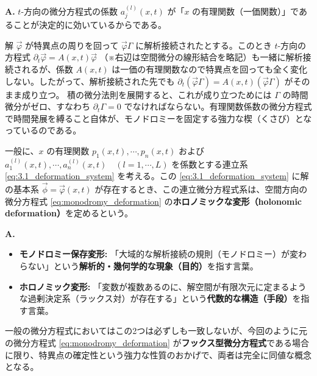 \begin{Q}
\textbf{A.} $t$-方向の微分方程式の係数 $a_j^{(l)}(x,t)$ が「$x$ の有理関数（一価関数）」であることが決定的に効いているからである。

解 $\vec{\varphi}$ が特異点の周りを回って $\vec{\varphi}\Gamma$ に解析接続されたとする。このとき $t$-方向の方程式 $\partial_t \vec{\varphi} = A(x,t)\vec{\varphi}$ （※右辺は空間微分の線形結合を略記）も一緒に解析接続されるが、係数 $A(x,t)$ は一価の有理関数なので特異点を回っても全く変化しない。したがって、解析接続された先でも $\partial_t (\vec{\varphi}\Gamma) = A(x,t)(\vec{\varphi}\Gamma)$ がそのまま成り立つ。
積の微分法則を展開すると、これが成り立つためには $\Gamma$ の時間微分がゼロ、すなわち $\partial_t \Gamma = 0$ でなければならない。有理関数係数の微分方程式で時間発展を縛ること自体が、モノドロミーを固定する強力な楔（くさび）となっているのである。
\end{Q}

\begin{definition}[ホロノミックな変形]
一般に、$x$ の有理関数 $p_{1}(x,t), \cdots, p_{n}(x,t)$ および $a_{1}^{(l)}(x,t), \cdots, a_{n}^{(l)}(x,t) \quad (l=1,\cdots,L)$ を係数とする連立系 \eqref{eq:3.1_deformation_system} を考える。この \eqref{eq:3.1_deformation_system} に解の基本系 $\vec{\phi}=\vec{\varphi}(x,t)$ が存在するとき、この連立微分方程式系は、空間方向の微分方程式 \eqref{eq:monodromy_deformation} の\textbf{ホロノミックな変形（holonomic deformation）}を定めるという。
\end{definition}

\begin{Q}
\textbf{A.} 
\begin{itemize}
    \item \textbf{モノドロミー保存変形:} 「大域的な解析接続の規則（モノドロミー）が変わらない」という\textbf{解析的・幾何学的な現象（目的）}を指す言葉。
    \item \textbf{ホロノミック変形:} 「変数が複数あるのに、解空間が有限次元に定まるような過剰決定系（ラックス対）が存在する」という\textbf{代数的な構造（手段）}を指す言葉。
\end{itemize}
一般の微分方程式においてはこの2つは必ずしも一致しないが、今回のように元の微分方程式 \eqref{eq:monodromy_deformation} が\textbf{フックス型微分方程式}である場合に限り、特異点の確定性という強力な性質のおかげで、両者は完全に同値な概念となる。
\end{Q}

